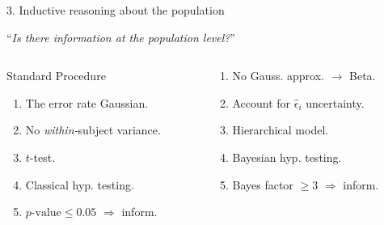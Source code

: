 \documentclass{beamer}
\begin{document}
\begin{frame}{3. Inductive reasoning about the population}
  \begin{center}
    ``\emph{Is there information at the population level?}''
  \end{center}
  
  \begin{columns}[t]
    \begin{column}{5.5cm}
      \begin{block}{Standard Procedure}
        \begin{enumerate}
        \item The error rate Gaussian.
        \item No \emph{within-}subject variance.
        \item $t$-test.
        \item Classical hyp. testing.
        \item $p\text{-value} \leq 0.05$ $\Rightarrow$ inform.
        \end{enumerate}
      \end{block}
    \end{column}
    \begin{column}{5.5cm}
      \begin{block}{\cite{olivetti2011bayesian}}
        \begin{enumerate}
        \item No Gauss. approx. $\rightarrow$ Beta.
        \item Account for $\hat{\epsilon}_i$ uncertainty.
        \item Hierarchical model.
        \item Bayesian hyp. testing.
        \item Bayes factor $\geq 3$ $\Rightarrow$ inform.
        \end{enumerate}
      \end{block}
    \end{column}
  \end{columns}
\end{frame}
\end{document}
